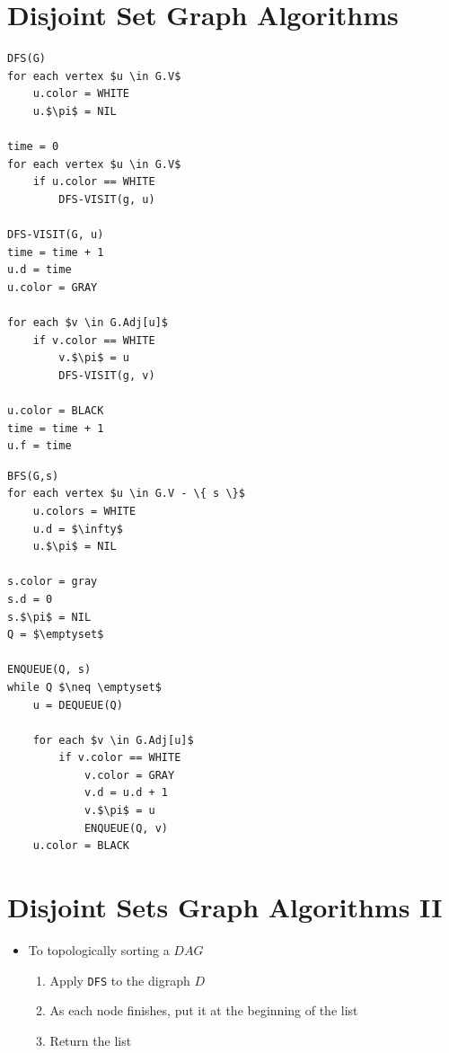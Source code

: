 \documentclass[12pt]{scrartcl}
\let\emptyset\varnothing{}
\begin{document}
\section{Disjoint Set Graph Algorithms}
\begin{lstlisting}
DFS(G)
for each vertex $u \in G.V$
    u.color = WHITE
    u.$\pi$ = NIL

time = 0
for each vertex $u \in G.V$
    if u.color == WHITE
        DFS-VISIT(g, u)

DFS-VISIT(G, u)
time = time + 1
u.d = time
u.color = GRAY

for each $v \in G.Adj[u]$
    if v.color == WHITE
        v.$\pi$ = u
        DFS-VISIT(g, v)

u.color = BLACK
time = time + 1
u.f = time
\end{lstlisting}

\begin{lstlisting}
BFS(G,s)
for each vertex $u \in G.V - \{ s \}$
    u.colors = WHITE
    u.d = $\infty$
    u.$\pi$ = NIL

s.color = gray
s.d = 0
s.$\pi$ = NIL
Q = $\emptyset$

ENQUEUE(Q, s)
while Q $\neq \emptyset$
    u = DEQUEUE(Q)

    for each $v \in G.Adj[u]$
        if v.color == WHITE
            v.color = GRAY
            v.d = u.d + 1
            v.$\pi$ = u
            ENQUEUE(Q, v)
    u.color = BLACK
\end{lstlisting}

\section{Disjoint Sets Graph Algorithms II}
\begin{itemize}
    \item To topologically sorting a $DAG$
        \begin{enumerate}
            \item Apply \texttt{DFS} to the digraph $D$
            \item As each node finishes, put it at the beginning of the list
            \item Return the list
        \end{enumerate}
\end{itemize}
\end{document}
